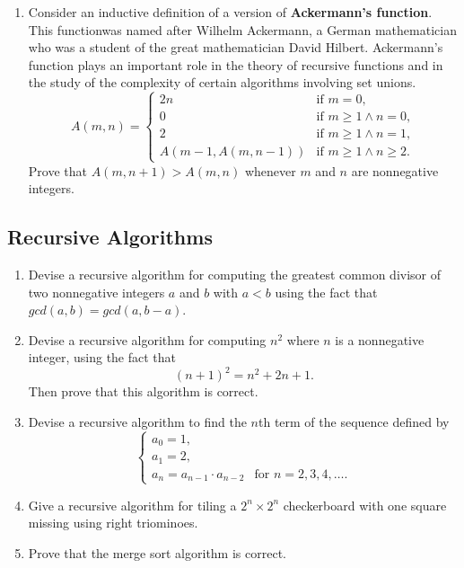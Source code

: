 \documentclass{../../cls/sig-alternate-05-2015}
\begin{document}
\begin{enumerate}
\item Consider an inductive definition of a version of \textbf{Ackermann's function}.
This functionwas named after Wilhelm Ackermann,
a German mathematician who was a student of the great mathematician David Hilbert.
Ackermann's function plays an important role in the theory of recursive functions and in the study of the complexity of certain algorithms involving set unions.
\begin{equation}
    A(m, n) = \begin{cases}
    2n & \text{if } m = 0,\\
    0 & \text{if } m \ge 1 \land n = 0,\\
    2 & \text{if } m \ge 1 \land n = 1,\\
    A(m - 1, A(m, n - 1)) & \text{if } m \ge 1 \land n \ge 2.
    \end{cases}
\end{equation}
Prove that $A(m, n + 1) > A(m, n)$ whenever $m$ and $n$ are
nonnegative integers.

\end{enumerate}

\subsection{Recursive Algorithms}
\begin{enumerate}
\item Devise a recursive algorithm for computing the greatest
common divisor of two nonnegative integers $a$ and $b$ with
$a < b$ using the fact that $gcd(a, b) = gcd(a, b - a)$.

\item Devise a recursive algorithm for computing $n^2$ where $n$ is a nonnegative integer,
using the fact that \begin{equation}
    (n + 1)^2 = n^2 + 2n + 1.
\end{equation}
Then prove that this algorithm is correct.

\item Devise a recursive algorithm to find the $n$th term of the sequence defined by \begin{equation}
    \begin{cases}
    a_0 = 1,\\
    a_1 = 2,\\
    a_n = a_{n-1} \cdot a_{n-2} & \text{for } n = 2, 3, 4, \ldots.
    \end{cases}
\end{equation}

\item Give a recursive algorithm for tiling a $2^n \times 2^n$ checkerboard with one square missing using right triominoes.

\item Prove that the merge sort algorithm is correct.
\end{enumerate}
\end{document}
